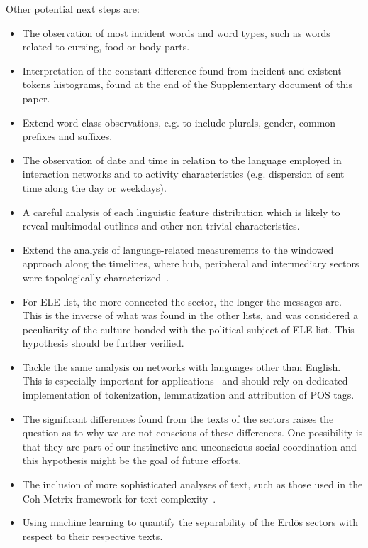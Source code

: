 \documentclass[review]{elsarticle}
\begin{document}
Other potential next steps are:
\begin{itemize}
\item The observation of most incident words and word types,
such as words related to cursing, food or body parts.
\item Interpretation of the constant difference found from incident and existent tokens histograms, found at the end of the Supplementary document of this paper.
\item Extend word class observations, e.g. to include plurals, gender, common prefixes and suffixes.
\item The observation of date and time in relation to the language employed in interaction networks and
to activity characteristics (e.g. dispersion of sent time along the day or weekdays).
\item A careful analysis of each linguistic feature distribution which is likely to reveal multimodal outlines and other non-trivial characteristics.
\item Extend the analysis of language-related measurements to the windowed approach along the timelines, where hub, peripheral and intermediary sectors were topologically characterized~\cite{stab}.
\item For ELE list, the more connected the sector, the longer the messages are.
This is the inverse of what was found in the other lists,
and was considered a peculiarity of the culture bonded with the political subject of ELE list.
This hypothesis should be further verified.
\item Tackle the same analysis on networks with languages other than English.
This is especially important for applications~\cite{ensaio}
and should rely on dedicated implementation of 
tokenization, lemmatization and attribution of POS tags.
\item The significant differences found from the texts of the sectors raises the question as to why we are not conscious of these differences.
One possibility is that they are part of our instinctive and unconscious social coordination and this hypothesis might be the goal of future efforts.
\item The inclusion of more sophisticated analyses of text, such as those used in the Coh-Metrix framework for text complexity~\cite{coh}.
\item Using machine learning to quantify the separability of the Erdös sectors with respect to their respective texts.
\end{itemize}
\end{document}
